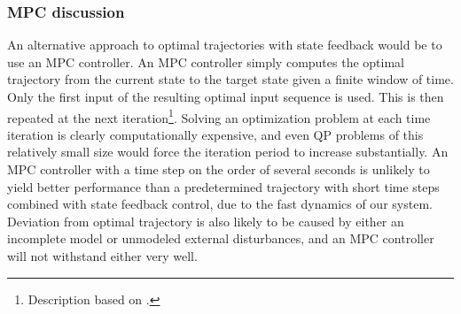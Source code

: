 \subsubsection{MPC discussion}

An alternative approach to optimal trajectories with state feedback would be to use an MPC controller. An MPC controller simply computes the optimal trajectory from the current state to the target state given a finite window of time. Only the first input of the resulting optimal input sequence is used. This is then repeated at the next iteration\footnote{Description based on \cite{Foss2014}.}. Solving an optimization problem at each time iteration is clearly computationally expensive, and even QP problems of this relatively small size would force the iteration period to increase substantially. An MPC controller with a time step on the order of several seconds is unlikely to yield better performance than a predetermined trajectory with short time steps combined with state feedback control, due to the fast dynamics of our system. Deviation from optimal trajectory is also likely to be caused by either an incomplete model or unmodeled external disturbances, and an MPC controller will not withstand either very well. 








